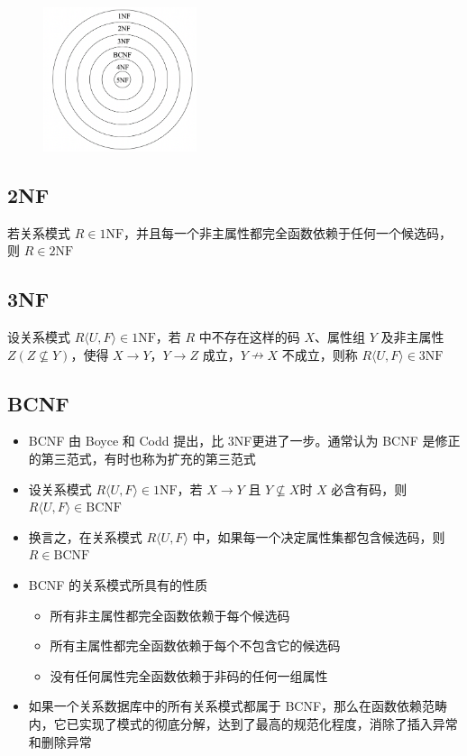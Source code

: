 \begin{figure}[H]
    \vspace{-0.5em}
	\centering
	\includegraphics[width=0.4\textwidth]{images/6.2.3}
    \vspace{-1em}
\end{figure}

\subsection{2NF}
若关系模式 $R\in 1\mathrm{NF}$，并且每一个非主属性都完全函数依赖于任何一个候选码，则 $R\in 2\mathrm{NF}$

\subsection{3NF}
设关系模式 $R\langle U,F\rangle \in 1\mathrm{NF}$，若 $R$ 中不存在这样的码 $X$、属性组 $Y$ 及非主属性 $Z(Z\not \subseteq Y)$，使得 $X\to Y$，$Y\to Z$ 成立，$Y \nrightarrow  X$ 不成立，则称 $R\langle U,F\rangle \in 3\mathrm{NF}$

\subsection{BCNF}
\begin{itemize}
    \item BCNF 由 Boyce 和 Codd 提出，比 3NF更进了一步。通常认为 BCNF 是修正的第三范式，有时也称为扩充的第三范式
    \item 设关系模式 $R\langle U,F\rangle \in 1\mathrm{NF}$，若 $X\to Y$ 且 $Y\not \subseteq X$时 $X$ 必含有码，则 $R\langle U,F\rangle \in \mathrm{BCNF}$
    \item 换言之，在关系模式 $R\langle U,F\rangle$ 中，如果每一个决定属性集都包含候选码，则 $R\in \mathrm{BCNF}$
    \item BCNF 的关系模式所具有的性质
    \begin{itemize}
        \item 所有非主属性都完全函数依赖于每个候选码
        \item 所有主属性都完全函数依赖于每个不包含它的候选码
        \item 没有任何属性完全函数依赖于非码的任何一组属性
    \end{itemize}
    \item 如果一个关系数据库中的所有关系模式都属于 BCNF，那么在函数依赖范畴内，它已实现了模式的彻底分解，达到了最高的规范化程度，消除了插入异常和删除异常
\end{itemize}

